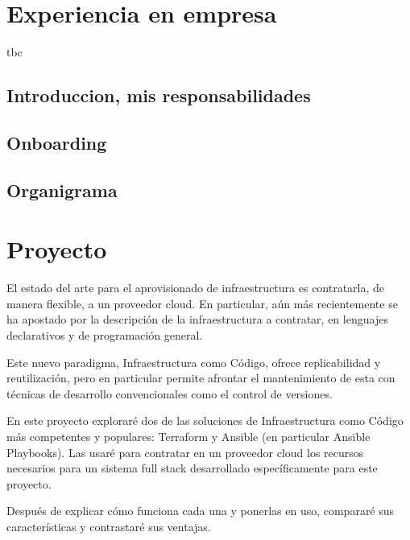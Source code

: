 \documentclass[11pt]{article}
\begin{document}
\begin{flushleft}

\clearpage
\section{Experiencia en empresa}
tbc
\linebreak

	\subsection{Introduccion, mis responsabilidades}
	\subsection{Onboarding}
	\subsection{Organigrama}








 


\clearpage
\section{Proyecto}
El estado del arte para el aprovisionado de infraestructura es contratarla, de manera flexible, a un proveedor cloud. En particular, aún más recientemente se ha apostado por la descripción de la infraestructura a contratar, en lenguajes declarativos y de programación general.

Este nuevo paradigma, Infraestructura como Código, ofrece replicabilidad y  reutilización, pero en particular permite afrontar el mantenimiento de esta con técnicas de desarrollo convencionales como el control de versiones.
	\linebreak

En este proyecto exploraré dos de las soluciones de Infraestructura como Código más competentes y populares: Terraform y Ansible (en particular Ansible Playbooks). Las usaré para contratar en un proveedor cloud los recursos necesarios para un sistema full stack desarrollado específicamente para este proyecto.
	\linebreak

Después de explicar cómo funciona cada una y ponerlas en uso, compararé sus características y contrastaré sus ventajas.



\end{flushleft}
\end{document}
